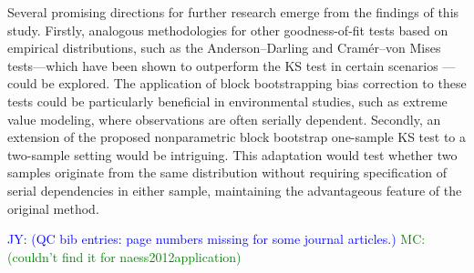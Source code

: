 \documentclass[12pt, titlepage, letterpaper]{article}
\newcommand{\jy}[1]{\textcolor{blue}{JY: (#1)}}
\newcommand{\mc}[1]{\textcolor{green}{MC: (#1)}}
\begin{document}
Several promising directions for further research emerge from the findings of
this study. Firstly, analogous methodologies for other goodness-of-fit tests
based on empirical distributions, such as the Anderson--Darling and Cramér--von
Mises tests---which have been shown to outperform the KS test in certain scenarios
\citep{stephens2017tests}---could be explored. The application of block
bootstrapping bias correction to these tests could be particularly beneficial in
environmental studies, such as extreme value modeling, where observations are
often serially dependent. Secondly, an extension of the proposed nonparametric
block bootstrap one-sample KS test to a two-sample setting would be
intriguing. This adaptation would test whether two samples originate from the
same distribution without requiring specification of serial dependencies in
either sample, maintaining the advantageous feature of the original method.


\jy{QC bib entries: page numbers missing for some journal articles.}
\mc{couldn't find it for naess2012application}



\end{document}
